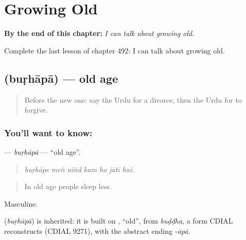 
\chapter{Growing Old}
\label{ch:ur-growing-old}

\begin{chapteropening}
\textbf{By the end of this chapter:} \emph{I can talk about growing old.}

Complete the last lesson of chapter 492: I can talk about growing old.
\end{chapteropening}

\section[\texorpdfstring{\ur{بڑھاپا} (buṛhāpā)}{بڑھاپا (buṛhāpā)}]{ (buṛhāpā) — old age}

\label{lesson:UR-C492-burhapa}



\begin{quote}
Before the new one: say the Urdu for a divorce, then the Urdu for to forgive.
\end{quote}

\subsection*{You'll want to know: }
\textbf{} — \emph{buṛhāpā} — \textquotedblleft{}old age\textquotedblright{}.

\begin{quote}
      
\end{quote}

\begin{quote}
\emph{buṛhāpe meṅ nīṅd kam ho jātī hai.}
\end{quote}

\begin{quote}
In old age people sleep less.
\end{quote}

Masculine.

\begin{cousinweb}
\textbf{} (\emph{buṛhāpā}) is inherited: it is built on \textbf{}, \textquotedblleft{}old\textquotedblright{}, from \emph{buḍḍha}, a form CDIAL reconstructs (CDIAL 9271), with the abstract ending \emph{-āpā}.
\end{cousinweb}

